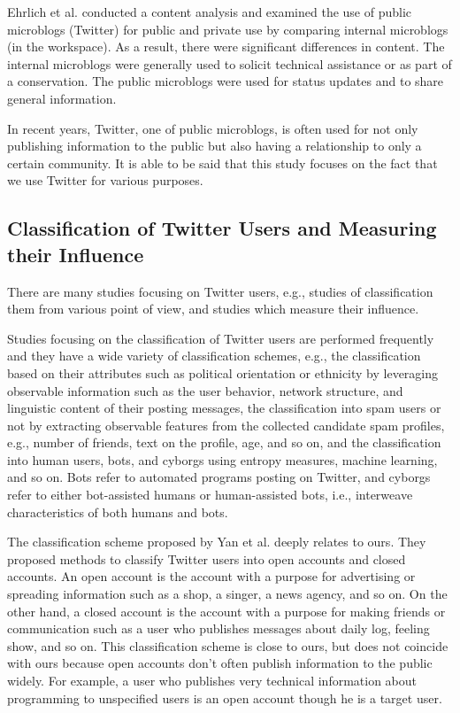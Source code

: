 Ehrlich et al.\cite{ehrlich2010microblogging} conducted a
content analysis and examined the use of public microblogs
(Twitter) for public and private use by comparing internal
microblogs (in the workspace).  As a result, there were
significant differences in content.  The internal microblogs
were generally used to solicit technical assistance or as part of a
conservation.  The public microblogs were used for status
updates and to share general information.

In recent years, Twitter, one of public microblogs, is often
used for not only publishing information to the public but also having a
relationship to only a certain community.  It is able to be said that
this study focuses on the fact that we use Twitter for various purposes.

\subsection{Classification of Twitter Users and Measuring their Influence}
\label{subsec:Twitter User}

There are many studies focusing on Twitter users, e.g., studies of
classification them from various point of view, and studies which measure
their influence.

Studies focusing on the classification of Twitter users are performed
frequently and they have a wide variety of classification schemes, e.g.,
the classification based on their attributes such as political
orientation or ethnicity by leveraging observable information such as
the user behavior, network structure, and linguistic content of their
posting messages\cite{pennacchiotti2011machine}, the classification
into spam users or not by extracting observable features from the
collected candidate spam profiles, e.g., number of friends, text on the
profile, age, and so on\cite{lee2010social}, and the classification
into human users, bots, and cyborgs using entropy measures, machine
learning, and so on\cite{chu2010tweeting}.  Bots refer to automated
programs posting on Twitter, and cyborgs refer to either bot-assisted
humans or human-assisted bots, i.e., interweave characteristics of both
humans and bots.

The classification scheme proposed by Yan et
al.\cite{yan2013classifying} deeply relates to ours.  They proposed
methods to classify Twitter users into open accounts and closed
accounts.  An open account is the
account with a purpose for advertising or spreading information such as
a shop, a singer, a news agency, and so on.  On the other hand, a closed
account is the
account with a purpose for making friends or communication such as a
user who publishes messages about daily log, feeling show, and so on.
This classification scheme is close to ours, but does not coincide with
ours because open accounts don't often publish information to the public
widely.  For example, a user who publishes very technical information
about programming to unspecified users is an open account though he is a
target user.

